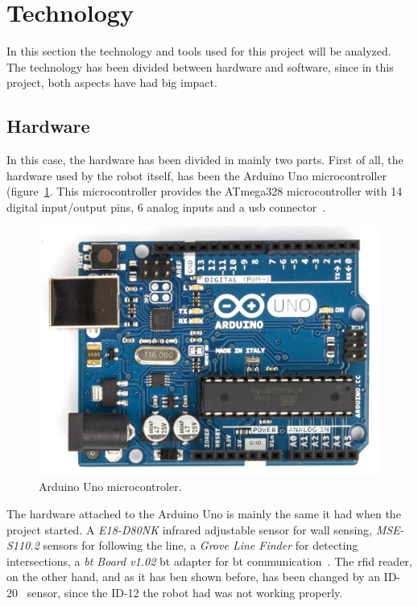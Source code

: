 \clearpage
\section{Technology}

In this section the technology and tools used for this project will be analyzed. The technology has
been divided between hardware and software, since in this project, both aspects have had big impact.

\subsection{Hardware}

In this case, the hardware has been divided in mainly two parts. First of all, the hardware used by
the robot itself, has been the Arduino Uno microcontroller (figure~\ref{fig:arduino_board}. This
microcontroller provides the ATmega328 microcontroller with 14 digital input/output pins, 6 analog
inputs and a \acrshort{usb} connector~\cite{arduino_datasheet}.

\begin{figure}[!htbp]
	\centering
	\includegraphics[height=0.3\textheight]{fig/arduino-board.jpg}
	\caption{Arduino Uno microcontroler.}
	\label{fig:arduino_board}
\end{figure}

The hardware attached to the Arduino Uno is mainly the same it had when the project started. A
\emph{E18-D80NK} infrared adjustable sensor for wall sensing, \emph{MSE-S110.2} sensors for
following the line, a \emph{Grove Line Finder} for detecting intersections, a
\emph{\acrshort{bt} Board v1.02} \acrlong{bt} adapter for \acrlong{bt} communication~\cite{fdp_itu}.
The \acrshort{rfid} reader, on the other hand, and as it has ben shown before, has been changed by
an ID-20~\cite{rfid} sensor, since the ID-12 the robot had was not working properly.

